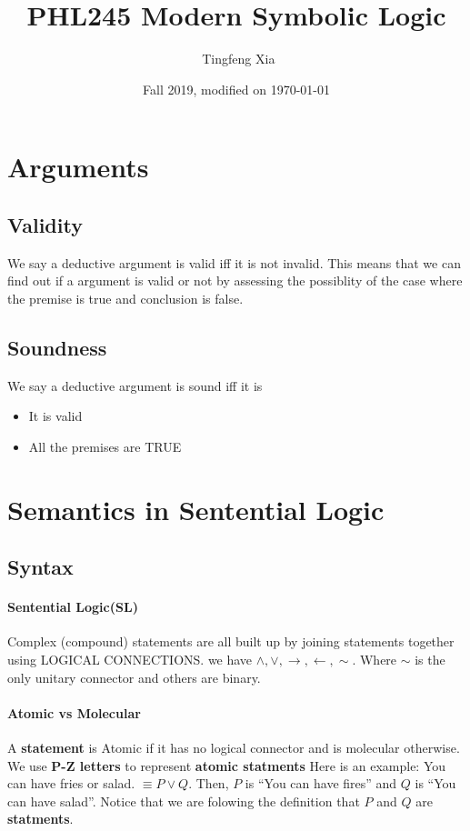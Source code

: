 \documentclass[10pt]{article}
\title{PHL245 Modern Symbolic Logic}
\author{\ccLogo \,\,Tingfeng Xia}
\date{Fall 2019, modified on \today}
\begin{document}
\maketitle
\doclicenseThis
\tableofcontents
\newpage

\section{Arguments}
\subsection{Validity}
We say a deductive argument is valid iff it is not invalid. This means that we can
find out if a argument is valid or not by assessing the possiblity of the case where 
the premise is true and conclusion is false.
\subsection{Soundness}
We say a deductive argument is sound iff it is 
\begin{itemize}
    \item It is valid
    \item All the premises are TRUE
\end{itemize}

\section{Semantics in Sentential Logic}
\subsection{Syntax}
\paragraph{Sentential Logic(SL)} Complex (compound) statements are all built up by joining statements together using LOGICAL CONNECTIONS.
we have $\wedge, \vee, \rightarrow, \leftarrow, \sim$. Where $\sim$ is the only unitary connector and others are binary.

\paragraph{Atomic vs Molecular} A \textbf{statement} is Atomic if it has no logical connector and is molecular otherwise. We use \textbf{P-Z letters} to represent \textbf{atomic statments}
Here is an example: You can have fries or salad. $\equiv P \vee Q.$ Then, $P$ is ``You can have fires'' and $Q$ is ``You can have salad''. Notice that we are folowing the definition that $P$ and $Q$ are \textbf{statments}.
\end{document}
